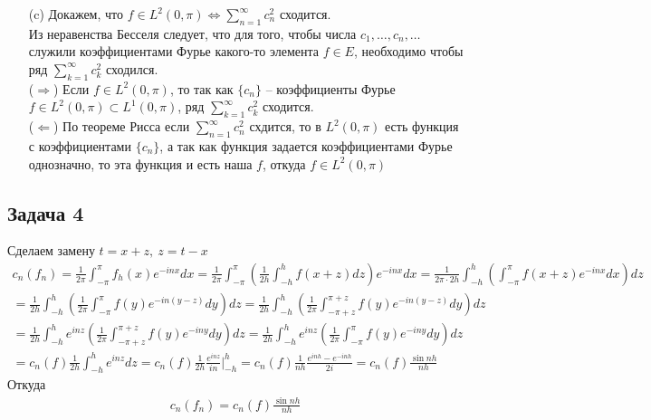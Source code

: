\begin{enumerate}
\item[(c)]
	Докажем, что $f \in L^2(0,\pi) \Leftrightarrow \sum\limits_{n=1}^{\infty} c_n^2$ сходится.\\
	Из неравенства Бесселя следует, что для того, чтобы числа $c_1, \ldots, c_n, \ldots$ служили коэффициентами Фурье какого-то элемента $f \in E$, необходимо чтобы ряд $\sum\limits_{k = 1}^{\infty} c_k^2$ сходился.\\
	($\Rightarrow$) Если $f \in L^2(0,\pi)$, то так как $\{c_n\}$ -- коэффициенты Фурье $f \in L^2(0,\pi) \subset L^1(0,\pi)$, ряд $\sum\limits_{k=1}^{\infty} c_k^2$ сходится.\\
	($\Leftarrow$) По теореме Рисса если $\sum\limits_{n = 1}^{\infty} c_n^2$ схдится, то в $L^2 (0,\pi)$ есть функция с коэффициентами $\{c_n\}$, а так как функция задается коэффициентами Фурье однозначно, то эта функция и есть наша $f$, откуда $f \in L^2(0,\pi)$
\end{enumerate} 
\vskip 0.4in

\subsection*{Задача 4}
	Сделаем замену $t = x + z,\ z = t - x$
	\begin{gather*}
	c_n(f_n)
	= \frac{1}{2\pi} \int_{-\pi}^{\pi} f_h(x) e^{-inx}dx
	= \frac{1}{2\pi} \int_{-\pi}^{\pi} \left(\frac{1}{2h} \int_{-h}^{h} f(x+z) dz\right)e^{-inx} dx
	= \frac{1}{2\pi \cdot 2h} \int_{-h}^{h} \left(\int_{-\pi}^{\pi} f(x+z)e^{-inx} dx\right)dz\\
	= \frac{1}{2h} \int_{-h}^{h} \left(\frac{1}{2\pi} \int_{-\pi}^{\pi} f(y) e^{-in(y-z)} dy\right) dz
	= \frac{1}{2h} \int_{-h}^{h}\left(\frac{1}{2\pi} \int_{-\pi+z}^{\pi+z} f(y) e^{-in(y-z)} dy\right) dz\\
	= \frac{1}{2h} \int_{-h}^{h} e^{inz} \left(\frac{1}{2\pi} \int_{-\pi+z}^{\pi+z} f(y) e^{-iny} dy\right) dz
	= \frac{1}{2h} \int_{-h}^{h} e^{inz} \left(\frac{1}{2\pi} \int_{-\pi}^{\pi} f(y) e^{-iny} dy\right) dz\\
	= c_n(f) \frac{1}{2h} \int_{-h}^{h} e^{inz} dz
	= c_n(f) \frac{1}{2h} \frac{e^{inz}}{in}\bigg|_{-h}^{h}
	= c_n(f) \frac{1}{nh} \frac{e^{inh} - e^{-inh}}{2i}
	= c_n(f) \frac{\sin nh}{nh}
	\end{gather*}
	Откуда
	\begin{gather*}
	c_n(f_n) = c_n(f) \frac{\sin nh}{nh}
	\end{gather*}
\vskip 0.4in

